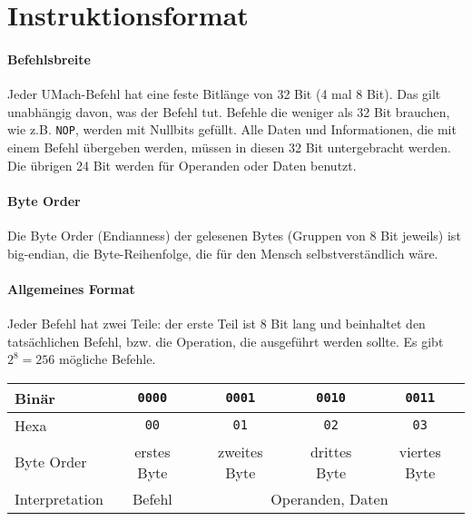 \section{Instruktionsformat}

\paragraph{Befehlsbreite}
Jeder UMach-Befehl hat eine feste Bitlänge von 32 Bit (4 mal 8 Bit).
Das gilt unabhängig davon, was der Befehl tut. Befehle die weniger als 32 Bit
brauchen, wie z.B. \texttt{NOP}, werden mit Nullbits gefüllt.
Alle Daten und Informationen, die mit einem Befehl übergeben werden, müssen in
diesen 32 Bit untergebracht werden. Die übrigen 24 Bit werden für Operanden oder
Daten benutzt.

\paragraph{Byte Order}
Die Byte Order (Endianness) der gelesenen Bytes (Gruppen von 8 Bit jeweils) ist
big-endian, die Byte-Reihenfolge, die für den Mensch selbstverständlich wäre.


\paragraph{Allgemeines Format}
Jeder Befehl hat zwei Teile: der erste Teil ist 8 Bit lang und beinhaltet den
tatsächlichen Befehl, bzw. die Operation, die ausgeführt werden sollte. Es gibt
$2^{8} = 256$ mögliche Befehle.

\begin{center}
  \begin{tabular}{l|*{4}{c|}}
    Binär &
    \texttt{0000} & \texttt{0001} & \texttt{0010} & \texttt{0011} \\\hline
    Hexa  &
    \texttt{00} & \texttt{01} & \texttt{02} & \texttt{03}         \\\hline
    Byte Order &
    erstes Byte & zweites Byte & drittes Byte & viertes Byte      \\\hline
    Interpretation &
    Befehl &
    \multicolumn{3}{c|}{Operanden, Daten} \\\hline
  \end{tabular}
\end{center}



